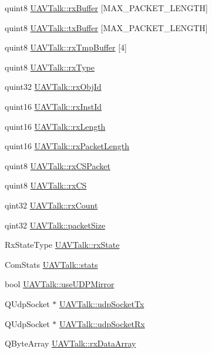 \begin{DoxyCompactItemize}
\item 
quint8 \hyperlink{group___u_a_v_talk_plugin_ga612e1b395a61ee81d90d8199ba789a86}{\-U\-A\-V\-Talk\-::rx\-Buffer} \mbox{[}\-M\-A\-X\-\_\-\-P\-A\-C\-K\-E\-T\-\_\-\-L\-E\-N\-G\-T\-H\mbox{]}
\item 
quint8 \hyperlink{group___u_a_v_talk_plugin_ga7f0eb8c42215b435a77b84d7ffdbbfc3}{\-U\-A\-V\-Talk\-::tx\-Buffer} \mbox{[}\-M\-A\-X\-\_\-\-P\-A\-C\-K\-E\-T\-\_\-\-L\-E\-N\-G\-T\-H\mbox{]}
\item 
quint8 \hyperlink{group___u_a_v_talk_plugin_ga94d59693bfbe92bf000ee85b559693e0}{\-U\-A\-V\-Talk\-::rx\-Tmp\-Buffer} \mbox{[}4\mbox{]}
\item 
quint8 \hyperlink{group___u_a_v_talk_plugin_ga59962a309157ed27efad61d5bf85f650}{\-U\-A\-V\-Talk\-::rx\-Type}
\item 
quint32 \hyperlink{group___u_a_v_talk_plugin_ga922e3ea36927c84023cfb0cf719c9aa0}{\-U\-A\-V\-Talk\-::rx\-Obj\-Id}
\item 
quint16 \hyperlink{group___u_a_v_talk_plugin_ga72761110b9b683dad5615619c9323674}{\-U\-A\-V\-Talk\-::rx\-Inst\-Id}
\item 
quint16 \hyperlink{group___u_a_v_talk_plugin_ga52cc4d0f063a520fcf7fc2a10254118b}{\-U\-A\-V\-Talk\-::rx\-Length}
\item 
quint16 \hyperlink{group___u_a_v_talk_plugin_ga8ce408e2fe258de7a15c77540055a81d}{\-U\-A\-V\-Talk\-::rx\-Packet\-Length}
\item 
quint8 \hyperlink{group___u_a_v_talk_plugin_gab6dc6fd77ce7d02c121d7c197dfdebd2}{\-U\-A\-V\-Talk\-::rx\-C\-S\-Packet}
\item 
quint8 \hyperlink{group___u_a_v_talk_plugin_gabfde70d24df43bcff2ab3c3da3f2444f}{\-U\-A\-V\-Talk\-::rx\-C\-S}
\item 
qint32 \hyperlink{group___u_a_v_talk_plugin_ga380dea6ca845f80612070ed17ea65655}{\-U\-A\-V\-Talk\-::rx\-Count}
\item 
qint32 \hyperlink{group___u_a_v_talk_plugin_gaa014be97504e5d24ac39f2808976685e}{\-U\-A\-V\-Talk\-::packet\-Size}
\item 
\-Rx\-State\-Type \hyperlink{group___u_a_v_talk_plugin_gacce7e3b2035887b09dce0fdbba0f1b58}{\-U\-A\-V\-Talk\-::rx\-State}
\item 
\-Com\-Stats \hyperlink{group___u_a_v_talk_plugin_ga35edebb70765f832afb1174152d4e20c}{\-U\-A\-V\-Talk\-::stats}
\item 
bool \hyperlink{group___u_a_v_talk_plugin_ga5198259bc34e6f215c111d731b822e3f}{\-U\-A\-V\-Talk\-::use\-U\-D\-P\-Mirror}
\item 
\-Q\-Udp\-Socket $\ast$ \hyperlink{group___u_a_v_talk_plugin_ga02f40e7ac97a6778928a5e9869ea5bc8}{\-U\-A\-V\-Talk\-::udp\-Socket\-Tx}
\item 
\-Q\-Udp\-Socket $\ast$ \hyperlink{group___u_a_v_talk_plugin_ga3fe3d99135440f58cb74fb73a4055ef4}{\-U\-A\-V\-Talk\-::udp\-Socket\-Rx}
\item 
\-Q\-Byte\-Array \hyperlink{group___u_a_v_talk_plugin_ga053813b68171430545f1bc1d69d450a0}{\-U\-A\-V\-Talk\-::rx\-Data\-Array}
\end{DoxyCompactItemize}
